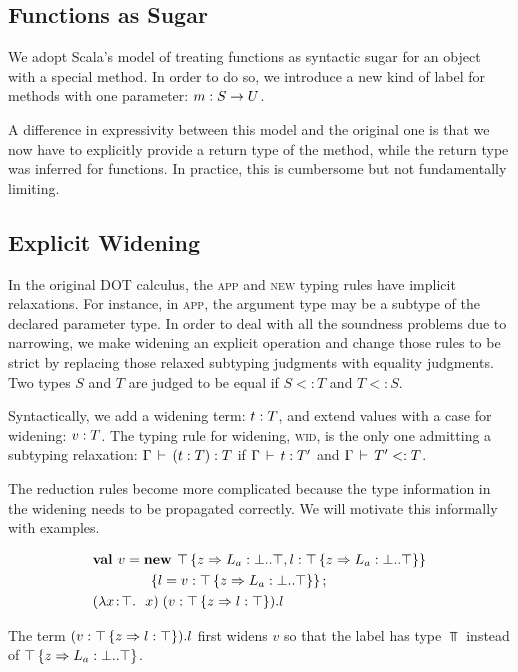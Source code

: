 \documentclass[preprint]{sigplanconf}
\begin{document}
\subsection{Functions as Sugar}\label{funsug}

We adopt Scala's model of treating functions as syntactic sugar for an
object with a special method. In order to do so, we introduce a new
kind of label for methods with one parameter: $m : S \rightarrow U$.

A difference in expressivity between this model and the original one
is that we now have to explicitly provide a return type of the method,
while the return type was inferred for functions. In practice, this is
cumbersome but not fundamentally limiting.

\subsection{Explicit Widening}\label{widening}

In the original DOT calculus, the \textsc{app} and \textsc{new} typing
rules have implicit relaxations. For instance, in \textsc{app}, the
argument type may be a subtype of the declared parameter type. In
order to deal with all the soundness problems due to narrowing, we
make widening an explicit operation and change those rules to be
strict by replacing those relaxed subtyping judgments with equality
judgments. Two types $S$ and $T$ are judged to be equal if $S <: T$
and $T <: S$.

Syntactically, we add a widening term: $t : T$, and extend values
with a case for widening: $v : T$. The typing rule for widening,
\textsc{wid}, is the only one admitting a subtyping relaxation:
$\Gamma \,\vdash\, (t : T) : T$ if $\Gamma \,\vdash\, t : T'$ and $\Gamma \,\vdash\, T'
<: T$.

The reduction rules become more complicated because the type
information in the widening needs to be propagated correctly. We will
motivate this informally with examples.

\begin{align*}
&\mlnew v {\Top \refine z {\Ldecl {L_a} \Bot \Top, \ldecl l {\Top \refine z {\Ldecl {L_a} \Bot \Top}}}\\
&\gap\gap\ldefs{l = \wid v {\Top \refine z {\Ldecl {L_a} \Bot \Top}}}}{
\app {(\abs x \Top x)} {(\wid v {\Top \refine z {\ldecl l \Top}}).l}
}
\end{align*}

The term $(v : \top \left\{z \Rightarrow l : \top \right\}).l$ first widens
$v$ so that the label has type $\Top$ instead of $\top \left\{z \Rightarrow L_a : \bot..\top \right\}$.
\end{document}

